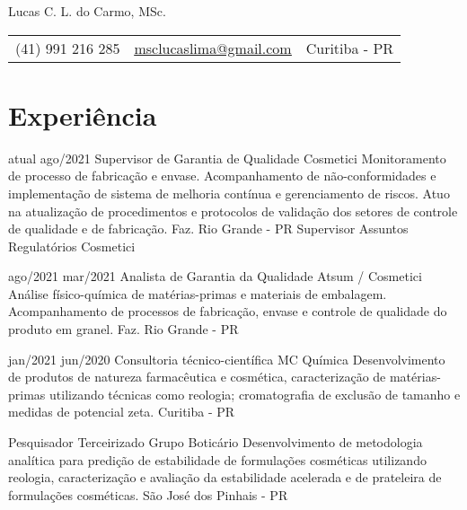 \pagestyle{fancy} %
\fancyhf{} 
\renewcommand{\headrulewidth}{0pt}


\thispagestyle{empty}

\begin{center}
	
	{\LARGE Lucas C. L. do Carmo, MSc.}
	
	\vspace{6pt}
	\begin{tabular}{c|c|c}
		(41) 991 216 285 & \textcolor{Accent}{\underline{\href{mailto:msclucaslima@gmail.com}{msclucaslima@gmail.com}}} & Curitiba - PR
	\end{tabular}

	\vspace{6pt}
	
\end{center}
	


\section{Experiência}

{atual}
{ago/2021}
{Supervisor de Garantia de Qualidade}
{Cosmetici}
{
	Monitoramento de processo de fabricação e envase.
	Acompanhamento de não-conformidades e implementação de
	sistema de melhoria contínua e gerenciamento de riscos.
	Atuo na atualização de procedimentos e protocolos de validação dos setores
	de controle de qualidade e de fabricação.
}
{Faz. Rio Grande - PR}
{Supervisor Assuntos Regulatórios}
{Cosmetici}
{}

\entry
{ago/2021}
{mar/2021}
{Analista de Garantia da Qualidade}
{Atsum / Cosmetici}
{
	Análise físico-química de matérias-primas e materiais de embalagem.
	Acompanhamento de processos de fabricação, envase e controle de qualidade do
	produto em granel.
}
{Faz. Rio Grande - PR}

\entry
{jan/2021}
{jun/2020}
{Consultoria técnico-científica}
{MC Química}
{
	Desenvolvimento de produtos de natureza farmacêutica e cosmética, 
	caracterização de matérias-primas utilizando técnicas como reologia;
	cromatografia de exclusão de tamanho e medidas de potencial zeta.
}
{Curitiba - PR}

{Pesquisador Terceirizado}
{Grupo Boticário}
{
	Desenvolvimento de metodologia analítica para predição de estabilidade
	de formulações cosméticas utilizando reologia,
	caracterização e avaliação da estabilidade acelerada e de prateleira
	de formulações cosméticas.
}
{São José dos Pinhais - PR}


